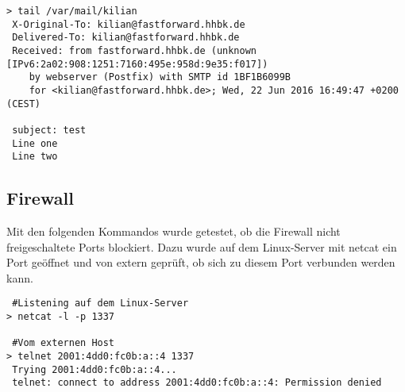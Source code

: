 \begin{lstlisting}[numbers=none]
> tail /var/mail/kilian 
 X-Original-To: kilian@fastforward.hhbk.de
 Delivered-To: kilian@fastforward.hhbk.de
 Received: from fastforward.hhbk.de (unknown [IPv6:2a02:908:1251:7160:495e:958d:9e35:f017])
	by webserver (Postfix) with SMTP id 1BF1B6099B
	for <kilian@fastforward.hhbk.de>; Wed, 22 Jun 2016 16:49:47 +0200 (CEST)

 subject: test
 Line one
 Line two
\end{lstlisting}

\subsection{Firewall}

Mit den folgenden Kommandos wurde getestet, ob die Firewall nicht freigeschaltete Ports blockiert. Dazu wurde auf dem Linux-Server mit {\sc netcat} ein Port geöffnet und von extern geprüft, ob sich zu diesem Port verbunden werden kann.

\begin{lstlisting}
 #Listening auf dem Linux-Server
> netcat -l -p 1337

 #Vom externen Host
> telnet 2001:4dd0:fc0b:a::4 1337
 Trying 2001:4dd0:fc0b:a::4...
 telnet: connect to address 2001:4dd0:fc0b:a::4: Permission denied
\end{lstlisting}

